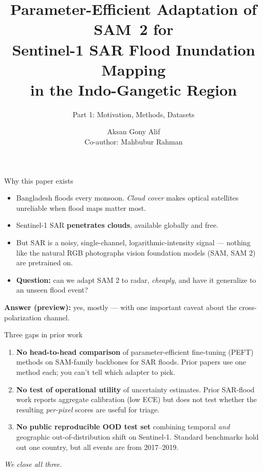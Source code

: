 \documentclass[aspectratio=169,11pt]{beamer}
\title{Parameter-Efficient Adaptation of SAM~2 for\\Sentinel-1 SAR Flood Inundation Mapping\\in the Indo-Gangetic Region}
\subtitle{Part 1: Motivation, Methods, Datasets}
\author{Aksan Gony Alif \\ {\small Co-author: Mahbubur Rahman}}
\institute{BRAC University}
\date{}
\begin{document}
\maketitle

\begin{frame}{Why this paper exists}
\begin{itemize}
    \item Bangladesh floods every monsoon. \emph{Cloud cover} makes optical satellites unreliable when flood maps matter most.
    \item Sentinel-1 SAR \textbf{penetrates clouds}, available globally and free.
    \item But SAR is a noisy, single-channel, logarithmic-intensity signal --- nothing like the natural RGB photographs vision foundation models (SAM, SAM 2) are pretrained on.
    \item \textbf{Question:} can we adapt SAM 2 to radar, \emph{cheaply}, and have it generalize to an unseen flood event?
\end{itemize}
\vspace{0.5em}
\textbf{Answer (preview):} yes, mostly --- with one important caveat about the cross-polarization channel.
\end{frame}

\begin{frame}{Three gaps in prior work}
\begin{enumerate}
    \item[\textbf{1.}] \textbf{No head-to-head comparison} of parameter-efficient fine-tuning (PEFT) methods on SAM-family backbones for SAR floods. Prior papers use one method each; you can't tell which adapter to pick.
    \vspace{0.5em}
    \item[\textbf{2.}] \textbf{No test of operational utility} of uncertainty estimates. Prior SAR-flood work reports aggregate calibration (low ECE) but does not test whether the resulting \emph{per-pixel} scores are useful for triage.
    \vspace{0.5em}
    \item[\textbf{3.}] \textbf{No public reproducible OOD test set} combining temporal \emph{and} geographic out-of-distribution shift on Sentinel-1. Standard benchmarks hold out one country, but all events are from 2017--2019.
\end{enumerate}
\vspace{0.5em}
\centering
\emph{We close all three.}
\end{frame}
\end{document}
